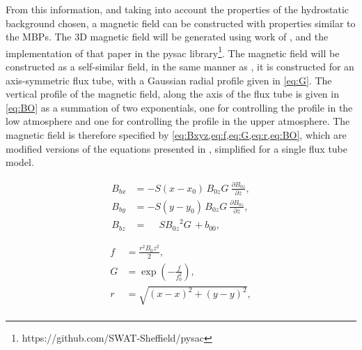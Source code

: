 \documentclass[a4paper,12pt,fourier,authoryear,custommargin]{Classes/PhDThesisPSnPDF}
\begin{document}
\newcommand{\BO}{{B_{0z}}}
\newcommand{\GO}{{G}}
\newcommand{\bc}{{b_{00}}}
\newcommand{\bF}{{b_{01}}}
\newcommand{\za}{{z_{1}}}
\newcommand{\bb}{{b_{02}}}
\newcommand{\zb}{{z_{2}}}

From this information, and taking into account the properties of the hydrostatic background chosen, a magnetic field can be constructed with properties similar to the MBPs.
The 3D magnetic field will be generated using work of \cite{gent2013, gent2014}, and the implementation of that paper in the pysac library\footnote{https://github.com/SWAT-Sheffield/pysac}.
The magnetic field will be constructed as a self-similar field, in the same manner as \cite{schluter1958}, it is constructed for an axis-symmetric flux tube, with a Gaussian radial profile given in \cref{eq:G}.
The vertical profile of the magnetic field, along the axis of the flux tube is given in \cref{eq:BO} as a summation of two exponentials, one for controlling the profile in the low atmosphere and one for controlling the profile in the upper atmosphere.
The magnetic field is therefore specified by \cref{eq:Bxyz,eq:f,eq:G,eq:r,eq:BO}, which are modified versions of the equations presented in \cite{gent2014}, simplified for a single flux tube model.

\begin{equation}\label{eq:Bxyz}
\begin{aligned}
B_{bx} &= -S(x-x_0) {\, \BO\GO \:} \frac{\partial \BO}{\partial z},
\\
B_{by} &= -S(y-y_0) {\, \BO\GO \:} \frac{\partial \BO}{\partial z},
\\        
B_{bz} &= \phantom{-}S{\BO^2\GO  \,} + \bc,
\end{aligned}
\end{equation}


\begin{align}
f &= \frac{r^2 B_0z^2}{2},  \label{eq:f}
\\
G &= \exp\left(-\frac{f}{f_0^2}\right),  \label{eq:G}
\\
r \,   &= \sqrt{(x-x )^2+(y-y )^2},\\  \label{eq:r}
\end{align}
\end{document}
